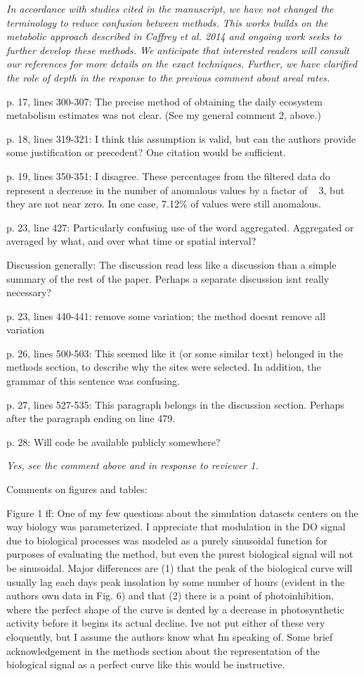 \documentclass[letterpaper,12pt]{article}\usepackage[]{graphicx}\usepackage[]{color}
\begin{document}
{\it In accordance with studies cited in the manuscript, we have not changed the terminology to reduce confusion between methods.  This works builds on the metabolic approach described in Caffrey et al. 2014 and ongoing work seeks to further develop these methods.  We anticipate that interested readers will consult our references for more details on the exact techniques.  Further, we have clarified the role of depth in the response to the previous comment about areal rates.}

p. 17, lines 300-307: The precise method of obtaining the daily ecosystem metabolism estimates was not clear. (See my general comment 2, above.)

p. 18, lines 319-321: I think this assumption is valid, but can the authors provide some justification or precedent? One citation would be sufficient.

p. 19, lines 350-351: I disagree. These percentages from the filtered data do represent a decrease
in the number of anomalous values by a factor of ~ 3, but they are not near zero. In one case,
7.12\% of values were still anomalous.

p. 23, line 427: Particularly confusing use of the word aggregated. Aggregated or averaged by
what, and over what time or spatial interval?

Discussion generally: The discussion read less like a discussion than a simple summary of the rest of the paper. Perhaps a separate discussion isnt really necessary?

p. 23, lines 440-441: remove some variation; the method doesnt remove all variation

p. 26, lines 500-503: This seemed like it (or some similar text) belonged in the methods section, to describe why the sites were selected. In addition, the grammar of this sentence was confusing.

p. 27, lines 527-535: This paragraph belongs in the discussion section. Perhaps after the paragraph ending on line 479.

p. 28: Will code be available publicly somewhere?

{\it Yes, see the comment above and in response to reviewer 1.}

Comments on figures and tables:

Figure 1 ff: One of my few questions about the simulation datasets centers on the way biology was parameterized. I appreciate that modulation in the DO signal due to biological processes was modeled as a purely sinusoidal function for purposes of evaluating the method, but even the purest biological signal will not be sinusoidal. Major differences are (1) that the peak of the biological curve will usually lag each days peak insolation by some number of hours (evident in the authors own data in Fig. 6) and that (2) there is a point of photoinhibition, where the perfect shape of the curve is dented by a decrease in photosynthetic activity before it begins its actual decline. Ive not put either of these very eloquently, but I assume the authors know what Im speaking of. Some brief acknowledgement in the methods section about the representation of the biological signal as a perfect curve like this would be instructive.
\end{document}
